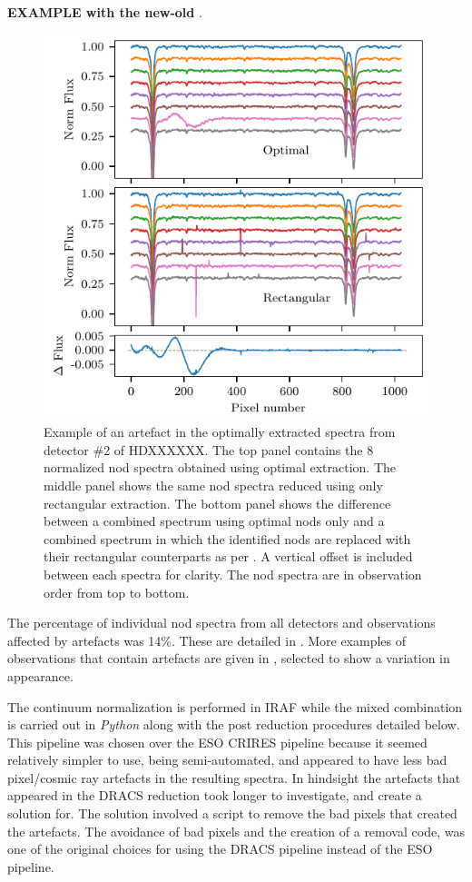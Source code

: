 \textbf{
EXAMPLE with the new-old }.
\begin{figure}
    \centering
    \includegraphics[width=\hsize/2]{figures/reduction/bp_plots/Bad_pixel_replacement}
    \caption{Example of an artefact in the optimally extracted spectra from detector \#2 of {\red{} HDXXXXXX}. The top panel contains the 8 normalized nod spectra obtained using optimal extraction. The middle panel shows the same nod spectra reduced using only rectangular extraction. The bottom panel shows the difference between a combined spectrum using optimal nods only and a combined spectrum in which the identified nods are replaced with their rectangular counterparts as per . A vertical offset is included between each spectra for clarity. The nod spectra are in observation order from top to bottom.}
    \label{fig:badpixelreplacement}
\end{figure}

The percentage of individual nod spectra from all detectors and observations affected by artefacts was 14\%. These are detailed in . More examples of observations that contain artefacts are given in , selected to show a variation in appearance.


The continuum normalization is performed in {IRAF} while the mixed combination is carried out in \emph{Python} along with the post reduction procedures detailed below. This pipeline was chosen over the {ESO} {CRIRES} pipeline because it seemed relatively simpler to use, being semi-automated, and appeared to have less bad pixel/cosmic ray artefacts in the resulting spectra. In hindsight the artefacts that appeared in the {DRACS} reduction took longer to investigate, and create a solution for. The solution involved a script to remove the bad pixels that created the artefacts. The avoidance of bad pixels and the creation of a removal code, was one of the original choices for using the {DRACS} pipeline instead of the {ESO} pipeline.


